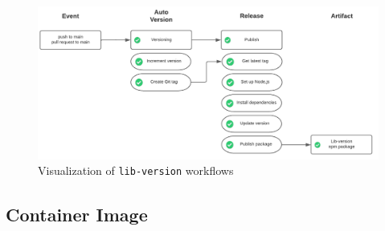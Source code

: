 \begin{figure}
    \centering
    \includegraphics[width=0.75\linewidth]{images/libversion_workflow.png}
    \caption{Visualization of \texttt{lib-version} workflows}
    \label{fig:libversion-workflow}
\end{figure}

\subsection{Container Image}
